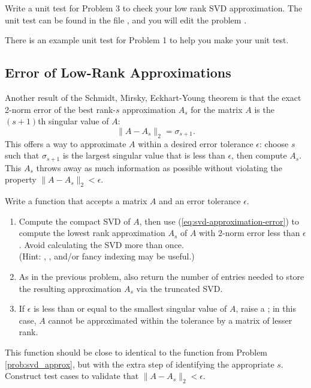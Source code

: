 \begin{unittest} %
Write a unit test for Problem 3 to check your low rank SVD approximation. The unit test can be found in the file , and you will edit the problem .

\noindent There is an example unit test for Problem 1 to help you make your unit test.
\end{unittest}

\subsection*{Error of Low-Rank Approximations} %

Another result of the Schmidt, Mirsky, Eckhart-Young theorem is that the exact 2-norm error of the best rank-$s$ approximation $A_s$ for the matrix $A$ is the $(s+1)$th singular value of $A$:
\begin{equation}
\label{eq:svd-approximation-error}
\|A - A_s\|_2 = \sigma_{s+1}.
\end{equation}
%
This offers a way to approximate $A$ within a desired error tolerance $\epsilon$:
choose $s$ such that $\sigma_{s+1}$ is the largest singular value that is less than $\epsilon$, then compute $A_s$.
This $A_s$ throws away as much information as possible without violating the property $\|A - A_s\|_2 < \epsilon$.

\begin{problem} %
Write a function that accepts a matrix $A$ and an error tolerance $\epsilon$.
\begin{enumerate}
\item Compute the compact SVD of $A$, then use (\ref{eq:svd-approximation-error}) to compute the lowest rank approximation $A_s$ of $A$ with 2-norm error less than $\epsilon$.
Avoid calculating the SVD more than once.
\\ (Hint: , , and/or fancy indexing may be useful.)
\item As in the previous problem, also return the number of entries needed to store the resulting approximation $A_s$ via the truncated SVD.
\item If $\epsilon$ is less than or equal to the smallest singular value of $A$, raise a ; in this case, $A$ cannot be approximated within the tolerance by a matrix of lesser rank.
\end{enumerate}
This function should be close to identical to the function from Problem \ref{prob:svd_approx}, but with the extra step of identifying the appropriate $s$.
Construct test cases to validate that $\| A - A_s \|_2 < \epsilon$.
\end{problem}

